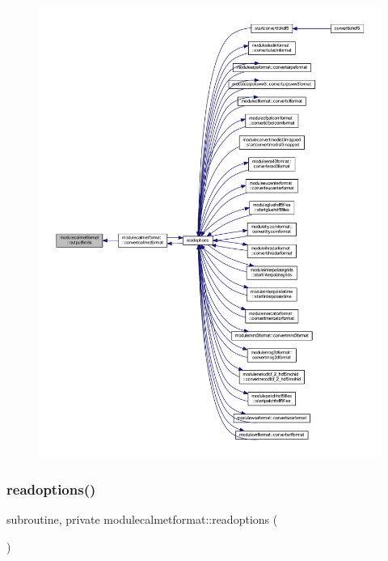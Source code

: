 \begin{figure}[H]
\begin{center}
\leavevmode
\includegraphics[width=350pt]{namespacemodulecalmetformat_a77546a7a587e6ab71724b1a5ebb7e709_icgraph}
\end{center}
\end{figure}
\mbox{\label{namespacemodulecalmetformat_a93959f38b7542f55aa7f2b9557c7ee20}} 
\subsubsection{\texorpdfstring{readoptions()}{readoptions()}}
{\footnotesize\ttfamily subroutine, private modulecalmetformat\+::readoptions (\begin{DoxyParamCaption}{ }\end{DoxyParamCaption})\hspace{0.3cm}{\ttfamily [private]}}

